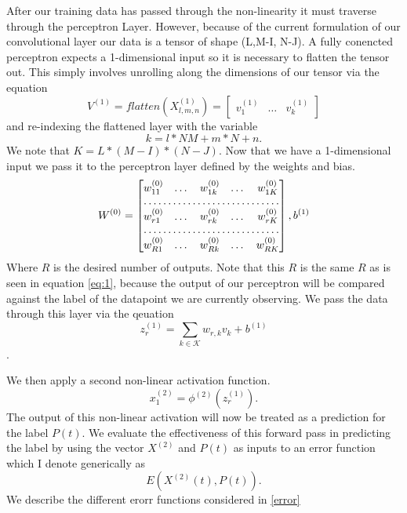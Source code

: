 \documentclass{article}
\begin{document}
After our training data has passed through the non-linearity it must traverse through the perceptron Layer.  However, because of the current formulation of our convolutional layer our data is a tensor of shape (L,M-I, N-J). A fully conencted perceptron expects a 1-dimensional input so it is necessary to flatten the tensor out.  This simply involves unrolling along the dimensions of our tensor via the equation
\begin{equation}
V^{(1)} =  flatten(X^{(1)}_{l,m,n}) = 
\begin{bmatrix}
v^{(1)}_{1} & \dots &v^{(1)}_{k} 
\end{bmatrix}
\end{equation} and re-indexing the flattened layer with the variable 
\begin{equation}
k = l*NM+m*N+n.
\end{equation}  We note that $K=L*(M-I)*(N-J)$.
Now that we have a 1-dimensional input we pass it to the perceptron layer defined by the weights and bias.
\begin{equation}
W^{(0)}=  \begin{bmatrix}
w^{(0)}_{11}  & \dots & w^{(0)}_{1k}& \dots& w^{(0)}_{1K} \\
\hdotsfor{5} \\
w^{(0)}_{r1}        & \dots& w^{(0)}_{rk} & \dots& w^{(0)}_{rK}\\
\hdotsfor{5}\\
w^{(0)}_{R1}        & \dots & w^{(0)}_{Rk}& \dots &w^{(0)}_{RK}
\end{bmatrix},
b^{(1)}
\end{equation}
Where $R$ is the desired number of outputs.  Note that this $R$ is the same $R$ as is seen in equation \ref{eq:1}, because the output of our perceptron will be compared against the label of the datapoint we are currently observing.  We pass the data through this layer via the qeuation
\begin{equation}
z^{(1)}_{r} = \sum_{k\in\mathcal{K}}w_{r,k}v_{k}+b^{(1)}	
\end{equation}.  

We then apply a second non-linear activation function.
\begin{equation}
x^{(2)}_{1} = \phi^{(2)}(z^{(1)}_r).
\end{equation}
The output of this non-linear activation will now be treated as a prediction for the label $P(t)$.  We evaluate the effectiveness of this forward pass in predicting the label by using the vector $X^{(2)}$ and $P(t)$ as inputs to an error function which I denote generically as
\begin{equation}
E(X^{(2)}(t), P(t)).
\end{equation}  We describe the different erorr functions considered in \ref{error}
\end{document}
